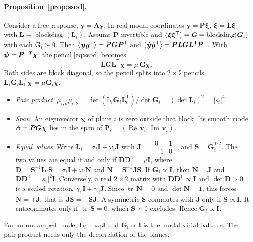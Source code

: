 \documentclass[preprint,12pt]{elsarticle}
\begin{document}
\paragraph{Proposition~\ref{prop:ssod}.} Consider a free response, $\dot{\bm{y}}=\bm{A}\bm{y}$. In real modal coordinates $\bm{y}=\bm{P}\bm{\xi}$, $\dot{\bm{\xi}}=\bm{L}\bm{\xi}$ with $\bm{L}=\operatorname{blockdiag}(\bm{L}_i)$. Assume $\bm{P}$ invertible and $\left\langle \bm{\xi}\bm{\xi}^{\mathsf T} \right\rangle=\bm{G}=\operatorname{blockdiag}(\bm{G}_i)$ with each $\bm{G}_i\succ0$. Then $\left\langle \bm{y}\bm{y}^{\mathsf T} \right\rangle=\bm{P}\bm{G}\bm{P}^{\mathsf T}$ and $\left\langle \dot{\bm{y}}\dot{\bm{y}}^{\mathsf T} \right\rangle=\bm{P}\bm{L}\bm{G}\bm{L}^{\mathsf T}\bm{P}^{\mathsf T}$. With $\bm{\psi}=\bm{P}^{-\mathsf T}\bm{\chi}$, the pencil \eqref{eq:ssod} becomes
\begin{equation}
\bm{L}\bm{G}\bm{L}^{\mathsf T}\bm{\chi}=\mu\,\bm{G}\bm{\chi} .
\end{equation}
Both sides are block diagonal, so the pencil splits into $2\times2$ pencils $\bm{L}_i\bm{G}_i\bm{L}_i^{\mathsf T}\bm{\chi}=\mu\bm{G}_i\bm{\chi}$.
\begin{itemize}
\item \emph{Pair product.} $\mu_{i,a}\mu_{i,b}=\det(\bm{L}_i\bm{G}_i\bm{L}_i^{\mathsf T})/\det\bm{G}_i=(\det\bm{L}_i)^2=|s_i|^4$.
\item \emph{Span.} An eigenvector $\bm{\chi}$ of plane $i$ is zero outside that block. Its smooth mode $\bm{\phi}=\bm{P}\bm{G}\bm{\chi}$ lies in the span of $\bm{P}_i=(\operatorname{Re}\,\bm{v}_i,\operatorname{Im}\,\bm{v}_i)$.
\item \emph{Equal values.} Write $\bm{L}_i=\sigma_i\bm{I}+\omega_i\bm{J}$ with $\bm{J}=\big[\begin{smallmatrix}0&1\\-1&0\end{smallmatrix}\big]$, and $\bm{S}=\bm{G}_i^{1/2}$. The two values are equal if and only if $\bm{D}\bm{D}^{\mathsf T}=\mu\bm{I}$, where $\bm{D}=\bm{S}^{-1}\bm{L}_i\bm{S}=\sigma_i\bm{I}+\omega_i\bm{N}$ and $\bm{N}=\bm{S}^{-1}\bm{J}\bm{S}$. If $\bm{G}_i\propto\bm{I}$, then $\bm{N}=\bm{J}$ and $\bm{D}\bm{D}^{\mathsf T}=|s_i|^2\bm{I}$. Conversely, a real $2\times2$ matrix with $\bm{D}\bm{D}^{\mathsf T}\propto\bm{I}$ and $\det\bm{D}>0$ is a scaled rotation, $\gamma_1\bm{I}+\gamma_2\bm{J}$. Since $\operatorname{tr}\,\bm{N}=0$ and $\det\bm{N}=1$, this forces $\bm{N}=\pm\bm{J}$, that is $\bm{J}\bm{S}=\pm\bm{S}\bm{J}$. A symmetric $\bm{S}$ commutes with $\bm{J}$ only if $\bm{S}\propto\bm{I}$. It anticommutes only if $\operatorname{tr}\,\bm{S}=0$, which $\bm{S}\succ0$ excludes. Hence $\bm{G}_i\propto\bm{I}$.
\end{itemize}
For an undamped mode, $\bm{L}_i=\omega_i\bm{J}$ and $\bm{G}_i\propto\bm{I}$ is the modal virial balance. The pair product needs only the decorrelation of the planes.
\end{document}
